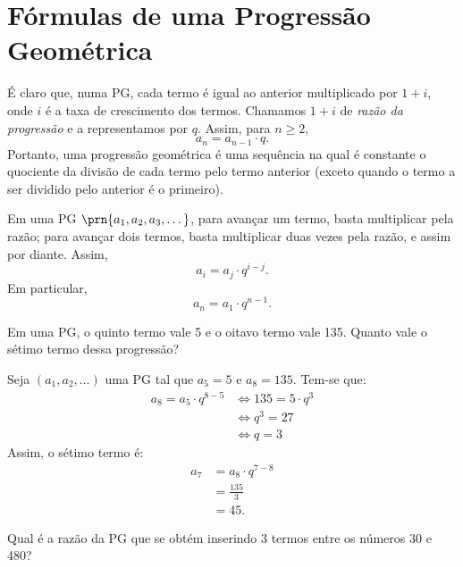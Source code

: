 \section{Fórmulas de uma Progressão Geométrica}

\begin{remark}
É claro que, numa PG, cada termo é igual ao anterior multiplicado por $1 + i$, onde $i$ é a taxa de crescimento dos termos. Chamamos $1+i$ de \emph{razão da progressão} e a representamos por $q$. Assim, para $n \ge 2$,
%
\begin{equation*}
a_n = a_{n-1} \cdot q.
\end{equation*}
%
\noindent Portanto, uma progressão geométrica é uma sequência na qual é constante o quociente da divisão de cada termo pelo termo anterior (exceto quando o termo a ser dividido pelo anterior é o primeiro). 

Em uma PG $\prn{a_1, a_2, a_3 , \dots}$, para avançar um termo, basta multiplicar pela razão; para avançar dois termos, basta multiplicar duas vezes pela razão, e assim por diante. Assim, 
%
\begin{equation*}
a_i = a_j \cdot q^{i-j}.
\end{equation*}
%
Em particular,
%
\begin{equation*}
a_n = a_1\cdot q^{n-1}.
\end{equation*}
\end{remark}

\begin{example}
Em uma PG, o quinto termo vale 5 e o oitavo termo vale 135. Quanto vale o sétimo termo dessa progressão?
\end{example}

\begin{solution}
Seja $(a_1, a_2, \dots)$ uma PG tal que $a_5 =5$ e $a_8=135$. Tem-se que:
%
\begin{align*}
a_8 = a_5 \cdot q^{8-5} & \iff 135 = 5 \cdot q ^3 \\ & \iff q^3 = 27 \\ & \iff q = 3
\end{align*}
%
Assim, o sétimo termo é:
%
\begin{align*}
a_7 & = a_8 \cdot q ^{7-8} \\ &= \frac {135} 3 \\ &= 45.
\end{align*}
\end{solution}

\begin{example}
Qual é a razão da PG que se obtém inserindo 3 termos entre os números 30 e 480?
\end{example}


